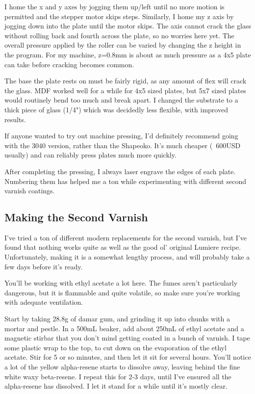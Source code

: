 \documentclass[11pt]{article}
\begin{document}

I home the x and y axes by jogging them up/left until no more motion is permitted and the stepper motor skips steps. Similarly, I home my z axis by jogging down into the plate until the motor skips. The axis cannot crack the glass without rolling back and fourth across the plate, so no worries here yet. The overall pressure applied by the roller can be varied by changing the z height in the program. For my machine, z=0.8mm is about as much pressure as a 4x5 plate can take before cracking becomes common.\newline

The base the plate rests on must be fairly rigid, as any amount of flex will crack the glass. MDF worked well for a while for 4x5 sized plates, but 5x7 sized plates would routinely bend too much and break apart. I changed the substrate to a thick piece of glass (1/4") which was decidedly less flexible, with improved results.\newline

If anyone wanted to try out machine pressing, I'd definitely recommend going with the 3040 version, rather than the Shapeoko. It's much cheaper (~600USD usually) and can reliably press plates much more quickly.\newline

After completing the pressing, I always laser engrave the edges of each plate. Numbering them has helped me a ton while experimenting with different second varnish coatings.\newline


\subsection{Making the Second Varnish}

I've tried a ton of different modern replacements for the second varnish, but I've found that nothing works quite as well as the good ol' original Lumiere recipe. Unfortunately, making it is a somewhat lengthy process, and will probably take a few days before it's ready.\newline

You'll be working with ethyl acetate a lot here. The fumes aren't particularly dangerous, but it is flammable and quite volatile, so make sure you're working with adequate ventilation.\newline

Start by taking 28.8g of damar gum, and grinding it up into chunks with a mortar and pestle. In a 500mL beaker, add about 250mL of ethyl acetate and a magnetic stirbar that you don't mind getting coated in a bunch of varnish. I tape some plastic wrap to the top, to cut down on the evaporation of the ethyl acetate. Stir for 5 or so minutes, and then let it sit for several hours. You'll notice a lot of the yellow alpha-resene starts to dissolve away, leaving behind the fine white waxy beta-resene. I repeat this for 2-3 days, until I've ensured all the alpha-resene has dissolved. I let it stand for a while until it's mostly clear.
\end{document}
